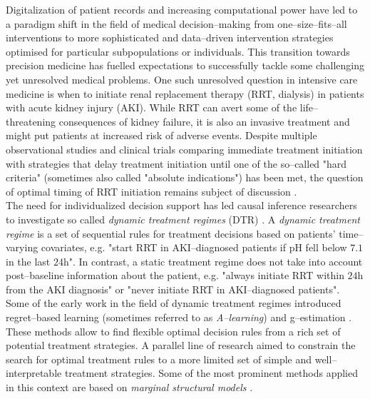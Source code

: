 \documentclass[12pt]{article}
\begin{document}
Digitalization of patient records and increasing computational power have led to a paradigm shift in the field of medical decision--making from one--size--fits--all interventions to more sophisticated and data--driven intervention strategies optimised for particular subpopulations or individuals. This transition towards precision medicine \citep{Ashley2015, Kosorok2019} has  fuelled expectations to successfully tackle some challenging yet unresolved medical problems. One such unresolved question in intensive care medicine is when to initiate renal replacement therapy (RRT, dialysis) in patients with acute kidney injury (AKI). While RRT can avert some of the life--threatening consequences of kidney failure, it is also an invasive treatment and might put patients at increased risk of adverse events. Despite multiple observational studies and clinical trials comparing immediate treatment initiation with strategies that delay treatment initiation until one of the so--called "hard criteria" (sometimes also called "absolute indications") has been met, the question of optimal timing of RRT initiation remains subject of discussion \citep{Gaudry2016, Zarbock2016, Vanmassenhove2017}. 
\\
\indent
The need for individualized decision support has led causal inference researchers to investigate so called \emph{dynamic treatment regimes} (DTR) \citep{Chakraborty2013, Tsiatis2020}. A \emph{dynamic treatment regime} is a set of sequential rules for treatment decisions based on patients' time--varying covariates, e.g. "start RRT in AKI--diagnosed patients if pH fell below $7.1$ in the last $24$h". In contrast, a static treatment regime does not take into account post--baseline information about the patient, e.g. "always initiate RRT within $24$h from the AKI diagnosis" or "never initiate RRT in AKI--diagnosed patients". Some of the early work in the field of dynamic treatment regimes introduced regret--based learning (sometimes referred to as \emph{A--learning}) \citep{Murphy2003} and g--estimation \citep{Robins2004}. These methods allow to find flexible optimal decision rules from a rich set of potential treatment strategies. A parallel line of research aimed to constrain the search for optimal treatment rules to a more limited set of simple and well--interpretable treatment strategies. Some of the most prominent methods applied in this context are based on \emph{marginal structural models} \citep{Murphy2001, VanderLaan2007, Orellana2010}. 
\\
\indent
\end{document}
